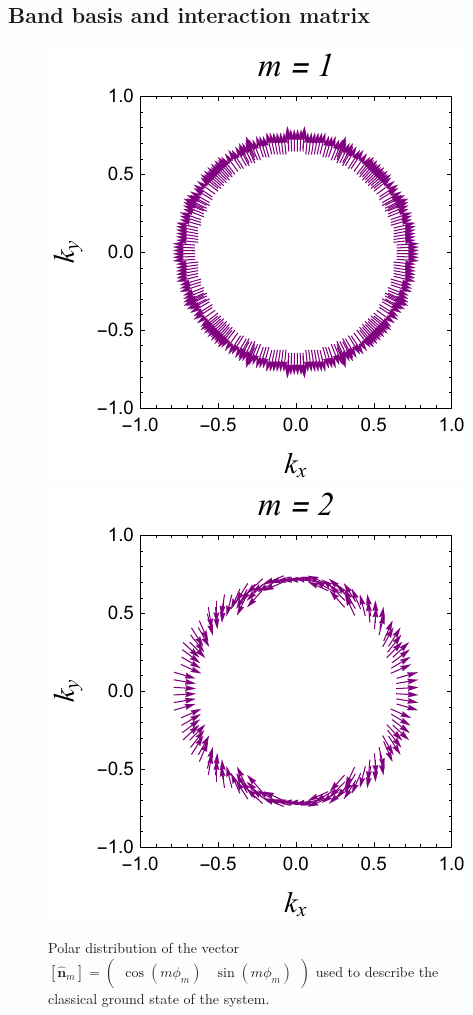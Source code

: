 \documentclass[english,aps,prd,nofootinbib,twocolumn]{revtex4-1}
\begin{document}
\subsection{Band basis and interaction matrix}
\label{sect:Supp:Band-basis}

\begin{figure}
\centering
\includegraphics[scale=0.8]{1Layer.pdf}
\includegraphics[scale=0.8]{2Layer.pdf}
\caption{Polar distribution of the vector $[\hat{\mathbf{n}}_{m}]= 
\begin{pmatrix}
\cos(m\phi_{m})	&	\!\!\sin(m\phi_{m})
\end{pmatrix}$ used to describe the classical ground state of the system.}
\label{fig:Classical-gound-state}
\end{figure}
\end{document}
